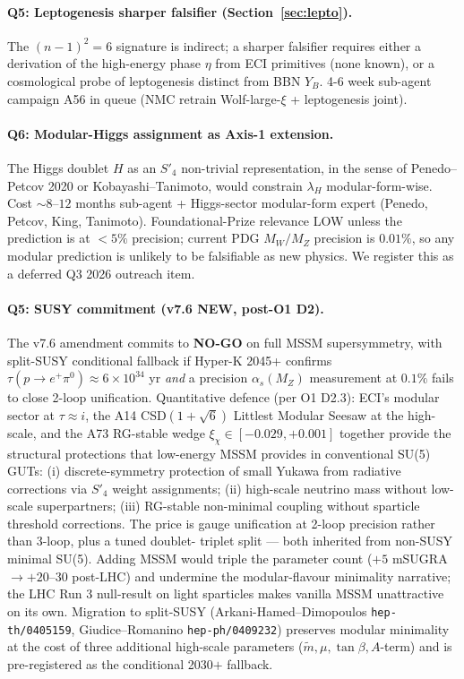 \documentclass[a4paper,11pt]{article}
\newcommand{\Spf}{S'_4}
\theoremstyle{definition}
\theoremstyle{remark}
\begin{document}
\paragraph{Q5: Leptogenesis sharper falsifier
(Section~\ref{sec:lepto}).}  The $(n-1)^2=6$ signature is
indirect; a sharper falsifier requires either a derivation of
the high-energy phase $\eta$ from ECI primitives (none known),
or a cosmological probe of leptogenesis distinct from BBN
$Y_B$.  4-6 week sub-agent campaign A56 in queue
(NMC retrain Wolf-large-$\xi$ + leptogenesis joint).

\paragraph{Q6: Modular-Higgs assignment as Axis-1 extension.}
The Higgs doublet $H$ as an $\Spf$ non-trivial
representation, in the sense of Penedo--Petcov 2020 \cite{NPP20}
or Kobayashi--Tanimoto, would constrain $\lambda_H$
modular-form-wise.  Cost $\sim 8$--$12$ months sub-agent +
Higgs-sector modular-form expert (Penedo, Petcov, King,
Tanimoto).  Foundational-Prize relevance LOW unless the
prediction is at $<5\%$ precision; current PDG $M_W/M_Z$
precision is $0.01\%$, so any modular prediction is unlikely
to be falsifiable as new physics.  We register this as a
deferred Q3 2026 outreach item.

\paragraph{Q5: SUSY commitment (v7.6 NEW, post-O1 D2).}
The v7.6 amendment commits to \textbf{NO-GO} on full MSSM
supersymmetry, with split-SUSY conditional fallback if Hyper-K
2045+ confirms $\tau(p\to e^{+}\pi^{0})\approx 6\times 10^{34}$
yr \emph{and} a precision $\alpha_{s}(M_{Z})$ measurement at
$0.1\%$ fails to close 2-loop unification.  Quantitative defence
(per O1 D2.3): ECI's modular sector at $\tau\approx i$, the A14
CSD$(1+\sqrt 6)$ Littlest Modular Seesaw at the high-scale, and
the A73 RG-stable wedge $\xi_{\chi}\in[-0.029,+0.001]$ together
provide the structural protections that low-energy MSSM provides
in conventional SU(5) GUTs: (i) discrete-symmetry protection of
small Yukawa from radiative corrections via $S'_{4}$ weight
assignments; (ii) high-scale neutrino mass without low-scale
superpartners; (iii) RG-stable non-minimal coupling without
sparticle threshold corrections.  The price is gauge unification
at 2-loop precision rather than 3-loop, plus a tuned doublet-
triplet split — both inherited from non-SUSY minimal SU(5).
Adding MSSM would triple the parameter count
($+5$ mSUGRA $\to +20$--$30$ post-LHC) and undermine the
modular-flavour minimality narrative; the LHC Run 3 null-result
on light sparticles makes vanilla MSSM unattractive on its own.
Migration to split-SUSY (Arkani-Hamed--Dimopoulos
\texttt{hep-th/0405159}, Giudice--Romanino \texttt{hep-ph/0409232})
preserves modular minimality at the cost of three additional
high-scale parameters ($\tilde m, \mu, \tan\beta, A$-term) and is
pre-registered as the conditional 2030$+$ fallback.
\end{document}
